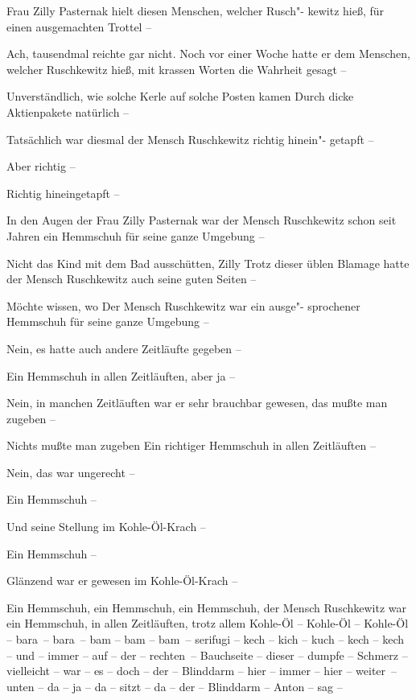 Frau Zilly Pasternak hielt diesen Menschen, welcher Rusch"-%
kewitz\eingriff{eS89-1}{Ruschkewitz ] Rusch kewitz} hieß, für einen ausgemachten Trottel --

Ach, tausendmal reichte gar nicht. Noch vor einer Woche hatte
er dem Menschen, welcher Ruschkewitz hieß, mit krassen
Worten die Wahrheit gesagt --

Unverständlich, wie solche Kerle auf solche Posten kamen\ausr{}
Durch dicke Aktienpakete natürlich --

Tatsächlich war diesmal der Mensch Ruschkewitz richtig hinein"-%
getapft --

Aber richtig --

Richtig hineingetapft --

In den Augen der Frau Zilly Pasternak war der Mensch
Ruschkewitz schon seit Jahren ein Hemmschuh für seine ganze
Umgebung --

Nicht das Kind mit dem Bad ausschütten, Zilly\ausr{} Trotz dieser
üblen Blamage hatte der Mensch Ruschkewitz auch seine
guten Seiten --

Möchte wissen, wo\ausr{} Der Mensch Ruschkewitz war ein ausge"-%
sprochener Hemmschuh für seine ganze Umgebung --

Nein, es hatte auch andere Zeitläufte gegeben --

Ein Hemmschuh in allen Zeitläuften, aber ja --

Nein, in manchen Zeitläuften war er sehr brauchbar gewesen,
das mußte man zugeben --

Nichts mußte man zugeben\ausr{} Ein richtiger Hemmschuh in
allen Zeitläuften --

Nein, das war ungerecht --

Ein Hemmschuh --

Und seine Stellung im Kohle-Öl-Krach --

Ein Hemmschuh --

Glänzend war er gewesen im Kohle-Öl-Krach --

Ein Hemmschuh, ein Hemmschuh, ein Hemmschuh, der Mensch
Ruschkewitz war ein Hemmschuh, in allen Zeitläuften, trotz
allem Kohle-Öl -- Kohle-Öl -- Kohle-Öl -- bara~--
bara~-- bam -- bam -- bam~-- serifugi -- kech -- kich -- kuch
-- kech -- kech -- und -- immer -- auf -- der -- rechten~--
Bauchseite -- dieser -- dumpfe -- Schmerz -- vielleicht --
war -- es -- doch -- der -- Blinddarm -- hier -- immer --
hier -- weiter~-- unten -- da -- ja -- da -- sitzt -- da -- der --
Blinddarm -- Anton -- sag --

